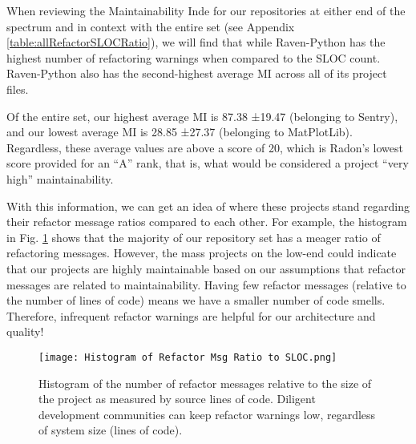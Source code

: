

When reviewing the Maintainability Inde for our repositories at either end of the spectrum and in context with the entire set (see Appendix \ref{table:allRefactorSLOCRatio}), we will find that while Raven-Python has the highest number of refactoring warnings when compared to the SLOC count. Raven-Python also has the second-highest average MI across all of its project files.

Of the entire set, our highest average MI is 87.38 ±19.47 (belonging to Sentry), and our lowest average MI is 28.85 ±27.37 (belonging to MatPlotLib). Regardless, these average values are above a score of 20, which is Radon's lowest score provided for an ``A'' rank, that is, what would be considered a project ``very high'' maintainability.

With this information, we can get an idea of where these projects stand regarding their refactor message ratios compared to each other. For example, the histogram in Fig. \ref{figHistogramRefactorRatio} shows that the majority of our repository set has a meager ratio of refactoring messages. However, the mass projects on the low-end could indicate that our projects are highly maintainable based on our assumptions that refactor messages are related to maintainability. Having few refactor messages (relative to the number of lines of code) means we have a smaller number of code smells. Therefore, infrequent refactor warnings are helpful for our architecture and quality!

\begin{figure}[ht]
  \centerline{
    \texttt{[image: Histogram of Refactor Msg Ratio to SLOC.png]}
  }
  \caption{Histogram of the number of refactor messages relative to the size of the project as measured by source lines of code. Diligent development communities can keep refactor warnings low, regardless of system size (lines of code).}
  \label{figHistogramRefactorRatio}
\end{figure}

